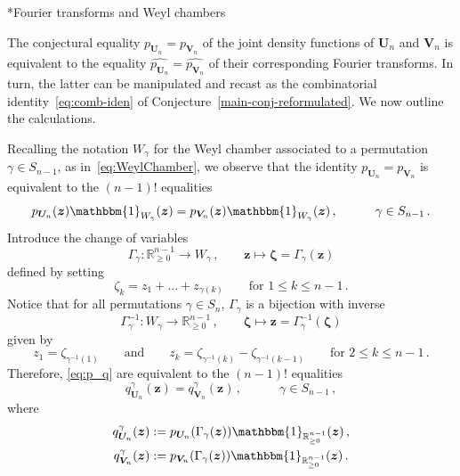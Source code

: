 \documentclass[a4paper,reqno,12pt]{amsart}
\makeatletter
\theoremstyle{plain}
\theoremstyle{definition}
\renewcommand\subsubsection{\@startsection{subsubsection}{3}%
  \z@{.5\linespacing\@plus.7\linespacing}{-.5em}%
  {\scshape}}
\newcommand{\R}{\mathbb{R}}
\newcommand{\1}{\mathbbm{1}}
\renewcommand{\hat}{\widehat}
\makeatother
\begin{document}
\subsubsection*{Fourier transforms and Weyl chambers}

The conjectural equality $p_{\bm{U}_n} = p_{\bm{V}_n}$ of the joint density functions of $\bm{U}_n$ and $\bm{V}_n$ is equivalent to the equality $\hat{p_{\bm{U}_n}} = \hat{p_{\bm{V}_n}}$ of their corresponding Fourier transforms.
In turn, the latter can be manipulated and recast as the combinatorial identity~\eqref{eq:comb-iden} of Conjecture~\ref{main-conj-reformulated}.
We now outline the calculations.

Recalling the notation $W_{\gamma}$ for the Weyl chamber associated to a permutation $\gamma\in S_{n-1}$, as in~\eqref{eq:WeylChamber}, we observe that the identity $p_{\bm{U}_n} = p_{\bm{V}_n}$ is equivalent to the $(n-1)!$ equalities
\begin{equation}
\label{eq:p_q}
p_{\bm{U}_n}(\bm{z}) \1_{W_{\gamma}}(\bm{z})
=p_{\bm{V}_n}(\bm{z})\1_{W_{\gamma}}(\bm{z}) \, , \qquad\quad \gamma\in S_{n-1} \, .
\end{equation}
Introduce the change of variables
\begin{equation}
\label{eq:changeVar}
\Gamma_{\gamma}\colon \R^{n-1}_{\geq 0}\to W_{\gamma}\, ,\qquad  
\bm{z}
\mapsto
\bm{\zeta}=\Gamma_{\gamma}(\bm{z})
\end{equation}
defined by  setting 
\[
\zeta_k = z_1 + \dots + z_{\gamma(k)}\qquad \text{for } 1\leq k\leq n-1 \, .
\]
Notice that for all permutations $\gamma\in S_n$, $\Gamma_{\gamma}$ is a bijection with inverse 
\begin{equation}
\label{eq:changeVar2}
\Gamma_{\gamma}^{-1}\colon W_{\gamma}\to  \R^{n-1}_{\geq 0}\, ,\qquad  
\bm{\zeta}\mapsto\bm{z}=\Gamma_{\gamma}^{-1}(\bm{\zeta})
\end{equation}
 given by
\[
z_1= \zeta_{\gamma^{-1}(1)}
\qquad\text{and}\qquad
z_k = \zeta_{\gamma^{-1}(k)} - \zeta_{\gamma^{-1}(k-1)} \qquad \text{for } 2\leq k\leq n-1 \, .
\]
Therefore, \eqref{eq:p_q} are equivalent to the $(n-1)!$ equalities
\begin{equation}
\label{eq:p_q_gamma}
q_{\bm{U}_n}^{\gamma}(\bm{z})
=q_{\bm{V}_n}^{\gamma}(\bm{z}) \, , \qquad\quad \gamma\in S_{n-1} \, ,
\end{equation}
where 
\begin{align*}
q_{\bm{U}_n}^{\gamma}(\bm{z})
&:= p_{\bm{U}_n}(\Gamma_{\gamma}(\bm{z}))\1_{\R^{n-1}_{\geq 0}}(\bm{z}) \, , \\
q_{\bm{V}_n}^{\gamma}(\bm{z})
&:= p_{\bm{V}_n}(\Gamma_{\gamma}(\bm{z}))\1_{\R^{n-1}_{\geq 0}}(\bm{z})  \, .
\end{align*}
\end{document}
